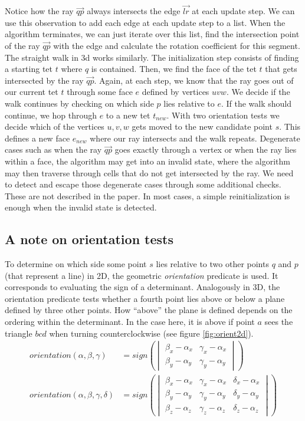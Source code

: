 \documentclass[../thesis.tex]{subfiles}
\begin{document}
Notice how the ray $\vec{qp}$ always intersects the edge $\vec{lr}$ at each update step.
We can use this observation to add each edge at each update step to a list.
When the algorithm terminates, we can just iterate over this list, find
the intersection point of the ray $\vec{qp}$ with the edge and calculate the rotation
coefficient for this segment.
The straight walk in 3d works similarly. The initialization step consists of finding a starting tet $t$
where $q$ is contained. Then, we find the face of the tet $t$ that gets intersected by the ray
$\vec{qp}$. Again, at each step, we know that the ray goes out of our current tet $t$ through some
face $e$ defined by vertices $uvw$. We decide if the walk continues by checking on which side $p$ lies relative to $e$.
If the walk should continue, we hop through $e$ to a new tet $t_{new}$. With two orientation tests
we decide which of the vertices $u, v, w$ gets moved to the new candidate point $s$. This defines
a new face $e_{new}$ where our ray intersects and the walk repeats.
Degenerate cases such as when the ray $\vec{qp}$ goes exactly through a vertex or
when the ray lies within a face, the algorithm may get into
an invalid state, where the algorithm may then traverse through
cells that do not get intersected by the ray. We need to detect and escape those degenerate cases
through some additional checks. These are not described in the paper\cite{Devillers}.
In most cases, a simple reinitialization is enough when the invalid state is detected.

\subsection{A note on orientation tests}
To determine on which side some point $s$ lies relative to two other points $q$ and $p$ (that represent a line) in 2D, the geometric \emph{orientation} predicate is used.
It corresponds to evaluating the sign of a determinant. Analogously in 3D, the orientation predicate
tests whether a fourth point lies above or below a plane defined by three other points.
How ``above'' the plane is defined depends on the ordering within the determinant. In the case here,
it is above if point $a$ sees the triangle $bcd$ when turning counterclockwise (see figure \ref{fig:orient2d}).
\begin{align*}
  orientation(\alpha, \beta, \gamma) &= 
  sign\left(
  \begin{vmatrix}
    \beta_x -\alpha_x & \gamma_x - \alpha_x \\
    \beta_y -\alpha_y & \gamma_y - \alpha_y 
  \end{vmatrix}\right)
  \\
  orientation(\alpha, \beta, \gamma, \delta) &= 
  sign\left(
  \begin{vmatrix}
    \beta_x -\alpha_x & \gamma_x - \alpha_x & \delta_x - \alpha_x \\
    \beta_y -\alpha_y & \gamma_y - \alpha_y & \delta_y - \alpha_y \\
    \beta_z -\alpha_z & \gamma_z - \alpha_z & \delta_z - \alpha_z
  \end{vmatrix}\right)
\end{align*}
\end{document}

